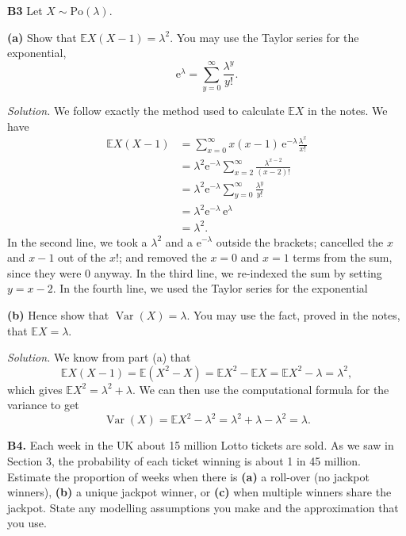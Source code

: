 \documentclass[
  a4paper,
]{book}
\theoremstyle{definition}
\theoremstyle{definition}
\theoremstyle{definition}
\theoremstyle{definition}
\theoremstyle{remark}
\begin{document}
\textbf{B3} Let \(X \sim \text{Po}(\lambda)\).

\textbf{(a)} Show that \(\mathbb EX(X-1) = \lambda^2\). You may use the Taylor series for the exponential,
\[ \mathrm{e}^\lambda = \sum_{y=0}^\infty \frac{\lambda^y}{y!} . \]

\begin{myanswers}
\emph{Solution.}
We follow exactly the method used to calculate \(\mathbb EX\) in the notes. We have
\begin{align*}
\mathbb EX(X-1) &= \sum_{x=0}^\infty x(x-1)\, \mathrm e^{-\lambda} \frac{\lambda^x}{x!} \\
  &= \lambda^2 \mathrm e^{-\lambda} \sum_{x=2}^\infty \frac{\lambda^{x-2}}{(x - 2)!} \\
  &= \lambda^2 \mathrm e^{-\lambda}\sum_{y=0}^\infty  \frac{\lambda^y}{y!} \\
  &= \lambda^2 \mathrm e^{-\lambda} \, \mathrm e^{\lambda} \\
  &= \lambda^2  .
\end{align*}
In the second line, we took a \(\lambda^2\) and a \(\mathrm e^{-\lambda}\) outside the brackets; cancelled the \(x\) and \(x-1\) out of the \(x!\); and removed the \(x = 0\) and \(x = 1\) terms from the sum, since they were 0 anyway. In the third line, we re-indexed the sum by setting \(y = x - 2\). In the fourth line, we used the Taylor series for the exponential

\end{myanswers}

\textbf{(b)} Hence show that \(\operatorname{Var}(X) = \lambda\). You may use the fact, proved in the notes, that \(\mathbb EX = \lambda\).

\begin{myanswers}
\emph{Solution.}
We know from part (a) that
\[ \mathbb EX(X-1) = \mathbb E(X^2 - X) = \mathbb EX^2 - \mathbb EX = \mathbb EX^2 - \lambda = \lambda^2 ,\]
which gives \(\mathbb EX^2 = \lambda^2 + \lambda\). We can then use the computational formula for the variance to get
\[ \operatorname{Var}(X) = \mathbb EX^2 - \lambda^2 = \lambda^2 + \lambda - \lambda^2 = \lambda .\]

\end{myanswers}

\textbf{B4.} Each week in the UK about 15 million Lotto tickets are sold. As we saw in Section 3, the probability of each ticket winning is about 1 in 45 million. Estimate the proportion of weeks when there is \textbf{(a)} a roll-over (no jackpot winners), \textbf{(b)} a unique jackpot winner, or \textbf{(c)} when multiple winners share the jackpot. State any modelling assumptions you make and the approximation that you use.
\end{document}

